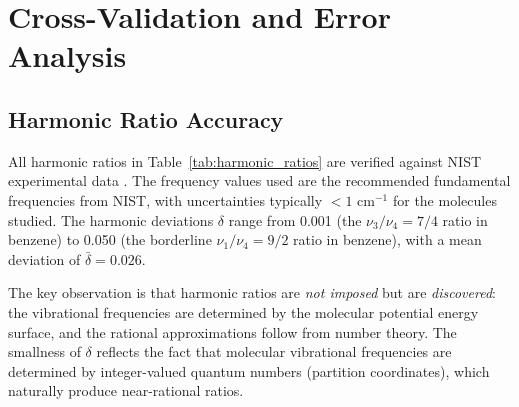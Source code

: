 \documentclass[11pt,twocolumn,a4paper]{article}
\theoremstyle{definition}
\theoremstyle{remark}
\begin{document}
\section{Cross-Validation and Error Analysis}
\label{sec:error_analysis}

\subsection{Harmonic Ratio Accuracy}

All harmonic ratios in Table~\ref{tab:harmonic_ratios} are verified against NIST experimental data \citep{shimanouchi1972, nist_webbook, huber1979}. The frequency values used are the recommended fundamental frequencies from NIST, with uncertainties typically $< 1$ cm$^{-1}$ for the molecules studied. The harmonic deviations $\delta$ range from 0.001 (the $\nu_3/\nu_4 = 7/4$ ratio in benzene) to 0.050 (the borderline $\nu_1/\nu_4 = 9/2$ ratio in benzene), with a mean deviation of $\bar{\delta} = 0.026$.

The key observation is that harmonic ratios are \emph{not imposed} but are \emph{discovered}: the vibrational frequencies are determined by the molecular potential energy surface, and the rational approximations follow from number theory. The smallness of $\delta$ reflects the fact that molecular vibrational frequencies are determined by integer-valued quantum numbers (partition coordinates), which naturally produce near-rational ratios.
\end{document}

